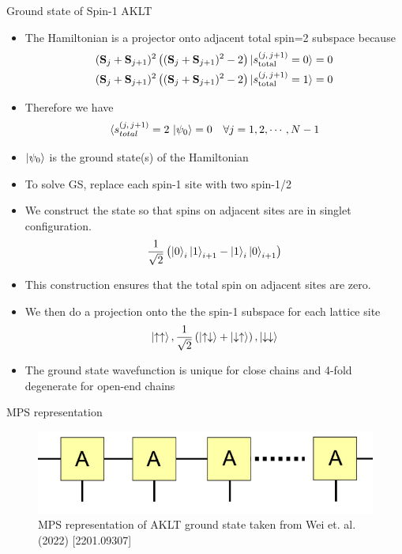 \documentclass[aspectratio=169,xcolor=dvipsnames, t]{beamer}
\begin{document}
\begin{frame}{Ground state of Spin-1 AKLT}
    \begin{itemize}
        \item The Hamiltonian is a projector onto adjacent total spin=2 subspace because
        \begin{align*}(\mathbf S_j + \mathbf S_{j+1})^2 \left((\mathbf S_j + \mathbf S_{j+1})^2-2\right)\ket{s_\text{total}^{(j,\,j+1)}=0} = 0\\
        (\mathbf S_j + \mathbf S_{j+1})^2 \left((\mathbf S_j + \mathbf S_{j+1})^2-2\right)\ket{s_\text{total}^{(j,\,j+1)}=1} = 0\\
        \end{align*}
        \item Therefore we have
        $$\braket{s_{total}^{(j,\, j+1)} = 2\,\,|\psi_0} = 0\quad \forall j=1,2,\cdots ,N-1$$
        \item $\ket{\psi_0}$ is the ground state(s) of the Hamiltonian
    \end{itemize}
\end{frame}

\begin{frame}
\begin{itemize}
    \item To solve GS, replace each spin-1 site with two spin-1/2 
    \item We construct the state so that spins on adjacent sites are in singlet configuration.
    $$\frac{1}{\sqrt{2}} \left(\ket{0}_i\ket{1}_{i+1}-\ket{1}_i\ket{0}_{i+1}\right)$$
    \item This construction ensures that the total spin on adjacent sites are zero. 
    
    \item We then do a projection onto the the spin-1 subspace for each lattice site
    $$\ket{\uparrow\uparrow}, \frac{1}{\sqrt{2}}\left(\ket{\uparrow\downarrow}+\ket{\downarrow\uparrow}\right),\ket{\downarrow\downarrow}$$
    \item The ground state wavefunction is unique for close chains and 4-fold degenerate for open-end chains
\end{itemize}
\end{frame}

\begin{frame}{MPS representation}
    \begin{figure}
        \centering
        \includegraphics{figures/MPS_AKLT_chain.png}
        \caption{MPS representation of AKLT ground state taken from Wei et. al. (2022) [2201.09307]}
    \end{figure}
\end{frame}
\end{document}
